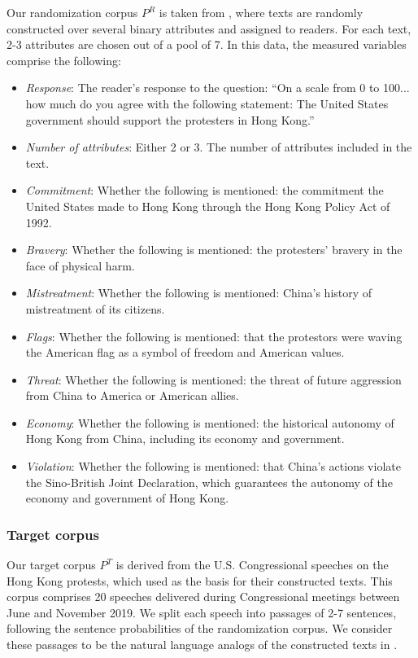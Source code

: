 \documentclass{article}
\begin{document}
Our randomization corpus $P^R$ is taken from \cite{fong2021causal}, where texts are randomly constructed over several binary attributes and assigned to readers. For each text, 2-3 attributes are chosen out of a pool of 7. In this data, the measured variables comprise the following:
\begin{itemize}
    \item \textit{Response}: The reader's response to the question: ``On a scale from 0 to 100... how much do you agree with the following statement: The United States government should support the protesters in Hong Kong.''
    \item \textit{Number of attributes}: Either 2 or 3. The number of attributes included in the text.
    \item \textit{Commitment}: Whether the following is mentioned: the commitment the United States made to Hong Kong through the Hong Kong Policy Act of 1992.
    \item \textit{Bravery}: Whether the following is mentioned: the protesters' bravery in the face of physical harm.
    \item \textit{Mistreatment}: Whether the following is mentioned: China's history of mistreatment of its citizens.
    \item \textit{Flags}: Whether the following is mentioned: that the protestors were waving the American flag as a symbol of freedom and American values.
    \item \textit{Threat}: Whether the following is mentioned: the threat of future aggression from China to America or American allies.
    \item \textit{Economy}: Whether the following is mentioned: the historical autonomy of Hong Kong from China, including its economy and government.
    \item \textit{Violation}: Whether the following is mentioned: that China's actions violate the Sino-British Joint Declaration, which guarantees the autonomy of the economy and government of Hong Kong.
\end{itemize}

\subsubsection{Target corpus}

Our target corpus $P^T$ is derived from the U.S. Congressional speeches on the Hong Kong protests, which \cite{fong2021causal} used as the basis for their constructed texts. This corpus comprises 20 speeches delivered during Congressional meetings between June and November 2019. We split each speech into passages of 2-7 sentences, following the sentence probabilities of the randomization corpus. We consider these passages to be the natural language analogs of the constructed texts in \cite{fong2021causal}.
\end{document}
